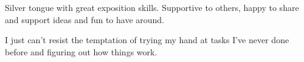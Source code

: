 \documentclass[11pt,a4paper,roman]{moderncv}
\begin{document}
{Silver tongue with great exposition skills. Supportive to others, happy to share and support ideas and fun to have around.}

{I just can't resist the temptation of trying my hand at tasks I've never done before and figuring out how things work.}




\renewcommand{\listitemsymbol}{-~}            %



%


\end{document}
